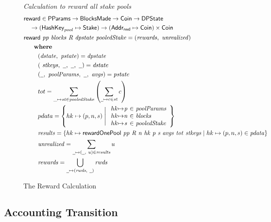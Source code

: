 \begin{figure}[htb]
  \emph{Calculation to reward all stake pools}
  \begin{align*}
      & \fun{reward} \in \PParams \to \BlocksMade \to \Coin\to \DPState \\
      & ~~~ \to (\HashKey_{pool} \mapsto \Stake) \to (\AddrRWD \mapsto \Coin)\times\Coin \\
      & \reward{pp}{blocks}{R}{dpstate}{pooledStake} = (\var{rewards},~\var{unrealized})\\
      & ~~~\where \\
      & ~~~~~~~(\var{dstate},~\var{pstate}) = \var{dpstate} \\
      & ~~~~~~~(~\var{stkeys},~\wcard,~\wcard,~\wcard) = \var{dstate} \\
      & ~~~~~~~(\wcard,~\var{poolParams},~\wcard,~\var{avgs}) = \var{pstate} \\
      & ~~~~~~~tot = \sum_{\_\mapsto st\in \var{pooledStake}}
                       \left(
                       \sum_{\wcard\mapsto c\in\var{st}}c
                       \right) \\
      & ~~~~~~~pdata = \left\{
        hk\mapsto (p, n, s)  \mathrel{\Bigg|}
        \begin{array}{r@{\mapsto}c@{~\in~}l}
          hk & \var{p} & \var{poolParams} \\
          hk & \var{n} & \var{blocks} \\
          hk & \var{s} & \var{pooledStake} \\
        \end{array}
      \right\} \\
      & ~~~~~~~\var{results} = \left\{
                 hk \mapsto \rewardOnePool{pp}{R}{n}{hk}{p}{s}{avgs}{tot}{stkeys}
                 \mid
                 hk\mapsto(p, n, s)\in\var{pdata} \right\} \\
      & ~~~~~~~\var{unrealized} = \sum_{\wcard\mapsto (\wcard,~u)\in\var{results}}u \\
      & ~~~~~~~\var{rewards} = \bigcup_{\wcard\mapsto(\var{rwds},~\wcard)}\var{rwds}
  \end{align*}
  \caption{The Reward Calculation}
  \label{fig:functions:reward-calc}
\end{figure}

\clearpage

\subsection{Accounting Transition}
\label{sec:acc-trans}

